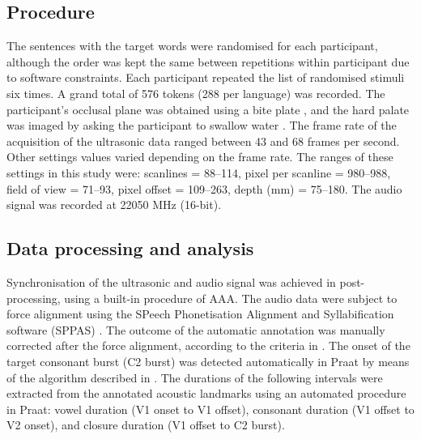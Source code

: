 \documentclass[authoryear, 5p]{elsarticle}
\begin{document}
\subsection{Procedure}\label{procedure}

The sentences with the target words were randomised for each
participant, although the order was kept the same between repetitions
within participant due to software constraints. Each participant
repeated the list of randomised stimuli six times. A grand total of 576
tokens (288 per language) was recorded. The participant's occlusal plane
was obtained using a bite plate \citep{scobbie2011}, and the hard palate
was imaged by asking the participant to swallow water
\citep{epstein2005}. The frame rate of the acquisition of the ultrasonic
data ranged between 43 and 68 frames per second. Other settings values
varied depending on the frame rate. The ranges of these settings in this
study were: scanlines = 88--114, pixel per scanline = 980--988, field of
view = 71--93, pixel offset = 109--263, depth (mm) = 75--180. The audio
signal was recorded at 22050 MHz (16-bit).

\subsection{Data processing and
analysis}\label{data-processing-and-analysis}

Synchronisation of the ultrasonic and audio signal was achieved in
post-processing, using a built-in procedure of AAA. The audio data were
subject to force alignment using the SPeech Phonetisation Alignment and
Syllabification software (SPPAS) \citep{bigi2015}. The outcome of the
automatic annotation was manually corrected after the force alignment,
according to the criteria in . The onset of the
target consonant burst (C2 burst) was detected automatically in Praat
\citep{boersma2016} by means of the algorithm described in
\citet{ananthapadmanabha2014}. The durations of the following intervals
were extracted from the annotated acoustic landmarks using an automated
procedure in Praat: vowel duration (V1 onset to V1 offset), consonant
duration (V1 offset to V2 onset), and closure duration (V1 offset to C2
burst).
\end{document}
